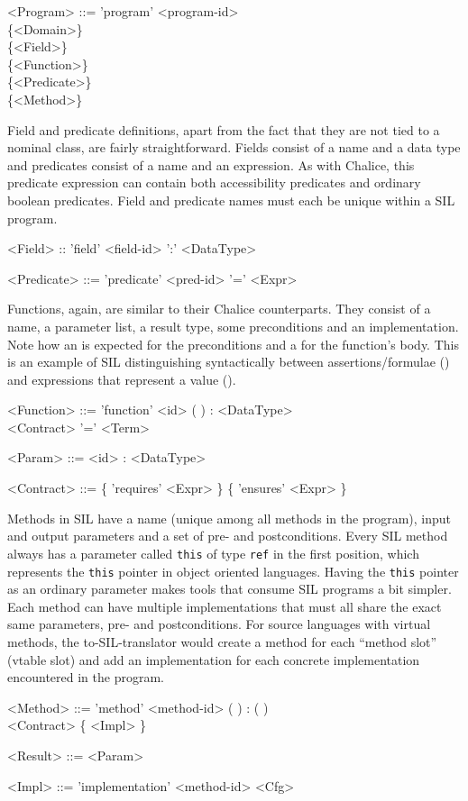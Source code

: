 \begin{grammar}
<Program> ::= 'program' <program-id> \\ 
 \{<Domain>\} \\
\{<Field>\} \\
 \{<Function>\} \\
 \{<Predicate>\} \\
 \{<Method>\} 
\end{grammar}

Field and predicate definitions, apart from the fact that they are not tied to a nominal class, are fairly straightforward. Fields consist of a name and a data type and predicates consist of a name and an expression. 
As with Chalice, this predicate expression can contain both accessibility predicates and ordinary boolean predicates.
Field and predicate names must each be unique within a SIL program.

\begin{grammar}
<Field> :: 'field' <field-id> ':' <DataType>

<Predicate> ::= 'predicate' <pred-id> '=' <Expr>
\end{grammar}

Functions, again, are similar to their Chalice counterparts.
They consist of a name, a parameter list, a result type, some preconditions and an implementation.
Note how an  is expected for the preconditions and a  for the function's body.
This is an example of SIL distinguishing syntactically between assertions/formulae () and expressions that represent a value ().
\begin{grammar}
<Function> ::= 'function' <id> (  ) : <DataType> \\
	<Contract> '=' <Term>

<Param> ::= <id> : <DataType>

<Contract> ::= \{ 'requires' <Expr> \} \{ 'ensures' <Expr> \}
\end{grammar}

Methods in SIL have a name (unique among all methods in the program), input and output parameters and a set of pre- and postconditions. 
Every SIL method always has a parameter called \lstinline[language=SIL]!this! of type \lstinline[language=SIL]!ref! in the first position, which represents the \lstinline[language=Chalice]!this! pointer in object oriented languages. 
Having the \lstinline[language=SIL]!this! pointer as an ordinary parameter makes tools that consume SIL programs a bit simpler.
Each method can have multiple implementations that must all share the exact same parameters, pre- and postconditions.
For source languages with virtual methods, the to-SIL-translator would create a method for each ``method slot'' (vtable slot) and add an implementation for each concrete implementation encountered in the program.
\begin{grammar}
<Method> ::= 'method' <method-id> (  ) : (  )\\
 <Contract> \{ <Impl> \}

<Result> ::= <Param>

<Impl> ::= 'implementation' <method-id> <Cfg>
\end{grammar}

